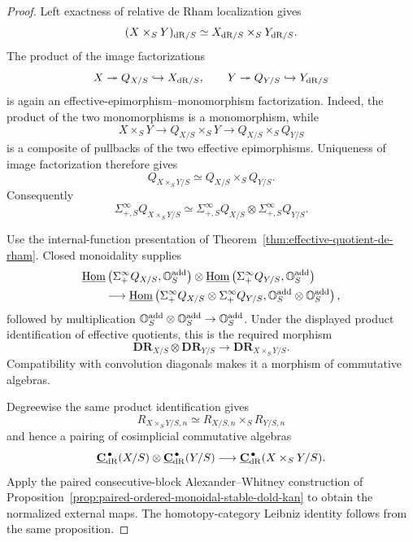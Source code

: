 \begin{proof}
Left exactness of relative de Rham localization gives
\[
    (X\times_SY)_{\mathrm{dR}/S}
    \simeq
    X_{\mathrm{dR}/S}\times_SY_{\mathrm{dR}/S}.
\]
The product of the image factorizations
\[
    X\twoheadrightarrow Q_{X/S}\hookrightarrow X_{\mathrm{dR}/S},
    \qquad
    Y\twoheadrightarrow Q_{Y/S}\hookrightarrow Y_{\mathrm{dR}/S}
\]
is again an effective-epimorphism--monomorphism factorization.  Indeed, the product of the two
monomorphisms is a monomorphism, while
\[
    X\times_SY
    \longrightarrow
    Q_{X/S}\times_SY
    \longrightarrow
    Q_{X/S}\times_SQ_{Y/S}
\]
is a composite of pullbacks of the two effective epimorphisms.  Uniqueness of image factorization
therefore gives
\[
\boxed{
    Q_{X\times_SY/S}
    \simeq
    Q_{X/S}\times_SQ_{Y/S}.
}
\]
Consequently
\[
    \Sigma^\infty_{+,S}Q_{X\times_SY/S}
    \simeq
    \Sigma^\infty_{+,S}Q_{X/S}
    \otimes
    \Sigma^\infty_{+,S}Q_{Y/S}.
\]

Use the internal-function presentation of Theorem~\ref{thm:effective-quotient-de-rham}.  Closed
monoidality supplies
\[
\begin{aligned}
    &\underline{\operatorname{Hom}}
    \left(\Sigma^\infty_+Q_{X/S},\mathbb O_S^{\mathrm{add}}\right)
    \otimes
    \underline{\operatorname{Hom}}
    \left(\Sigma^\infty_+Q_{Y/S},\mathbb O_S^{\mathrm{add}}\right)
    \\
    &\qquad\longrightarrow
    \underline{\operatorname{Hom}}
    \left(
        \Sigma^\infty_+Q_{X/S}\otimes\Sigma^\infty_+Q_{Y/S},
        \mathbb O_S^{\mathrm{add}}\otimes\mathbb O_S^{\mathrm{add}}
    \right),
\end{aligned}
\]
followed by multiplication
\(\mathbb O_S^{\mathrm{add}}\otimes\mathbb O_S^{\mathrm{add}}\to\mathbb O_S^{\mathrm{add}}\).  Under the displayed
product identification of effective quotients, this is the required morphism
\[
    \mathbf{DR}_{X/S}\otimes\mathbf{DR}_{Y/S}
    \longrightarrow
    \mathbf{DR}_{X\times_SY/S}.
\]
Compatibility with convolution diagonals makes it a morphism of commutative algebras.

Degreewise the same product identification gives
\[
    R_{X\times_SY/S,n}
    \simeq
    R_{X/S,n}\times_SR_{Y/S,n}
\]
and hence a pairing of cosimplicial commutative algebras
\[
    \underline{\mathbf C}_{\mathrm{dR}}^{\,\bullet}(X/S)
    \otimes
    \underline{\mathbf C}_{\mathrm{dR}}^{\,\bullet}(Y/S)
    \longrightarrow
    \underline{\mathbf C}_{\mathrm{dR}}^{\,\bullet}(X\times_SY/S).
\]
Apply the paired consecutive-block Alexander--Whitney construction of
Proposition~\ref{prop:paired-ordered-monoidal-stable-dold-kan} to obtain the normalized external maps.
The homotopy-category Leibniz identity follows from the same proposition.
\end{proof}



